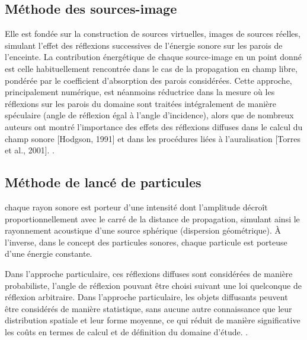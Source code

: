 	\subsection{Méthode des sources-image}
	Elle est fondée sur la construction de sources virtuelles,
images de sources réelles, simulant l’effet des réflexions successives de l’énergie sonore sur les parois
de l’enceinte. La contribution énergétique de chaque source-image en un point donné est celle
habituellement rencontrée dans le cas de la propagation en champ libre, pondérée par le coefficient
d’absorption des parois considérées. Cette approche, principalement numérique, est néanmoins
réductrice dans la mesure où les réflexions sur les parois du domaine sont traitées intégralement de
manière spéculaire (angle de réflexion égal à l’angle d’incidence), alors que de nombreux auteurs ont
montré l’importance des effets des réflexions diffuses dans le calcul du champ sonore [Hodgson,
1991] et dans les procédures liées à l’auralisation [Torres et al., 2001]. \cite{picaut}.
	
	\subsection{Méthode de lancé de particules}
chaque rayon sonore est porteur d’une intensité dont
l’amplitude décroît proportionnellement avec le carré de la distance de propagation, simulant ainsi
le rayonnement acoustique d’une source sphérique (dispersion géométrique). À l’inverse, dans le
concept des particules sonores, chaque particule est porteuse d’une énergie constante.


Dans l’approche particulaire, ces réflexions
diffuses sont considérées de manière probabiliste, l’angle de réflexion pouvant être choisi suivant
une loi quelconque de réflexion arbitraire.
Dans l’approche
particulaire, les objets diffusants peuvent être considérés de manière statistique, sans aucune autre
connaissance que leur distribution spatiale et leur forme moyenne, ce qui réduit de manière
significative les coûts en termes de calcul et de définition du domaine d’étude. \cite{picaut}.
	
